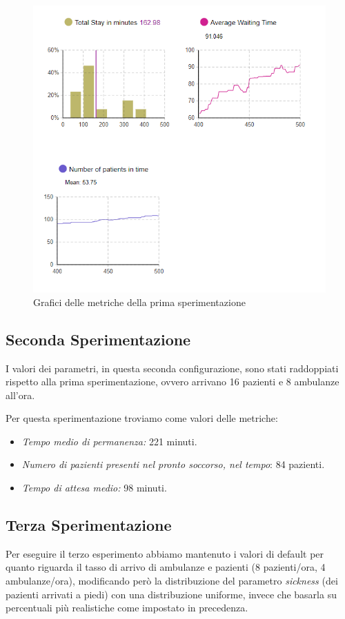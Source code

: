 \begin{figure}[!h]
    \centering
    \includegraphics[width=1\textwidth]{Immagini/sper1.png} 
    \caption{Grafici delle metriche della prima sperimentazione}
    \label{fig:graf1}
\end{figure}
\clearpage
\subsection{Seconda Sperimentazione} \label{cahp:seconda}
I valori dei parametri, in questa seconda configurazione, sono stati raddoppiati rispetto alla prima sperimentazione, ovvero arrivano 16 pazienti e 8 ambulanze all'ora. 


Per questa sperimentazione troviamo come valori delle metriche:
\begin{itemize}
    \item \textit{Tempo medio di permanenza:} 221 minuti.
    \item \textit{Numero di pazienti presenti nel pronto soccorso, nel tempo}: 84 pazienti.
    \item \textit{Tempo di attesa medio:} 98 minuti.
\end{itemize}

\subsection{Terza Sperimentazione}
Per eseguire il terzo esperimento abbiamo mantenuto i valori di default per quanto riguarda il tasso di arrivo di ambulanze e pazienti (8 pazienti/ora, 4 ambulanze/ora), modificando però la distribuzione del parametro \textit{sickness} (dei pazienti arrivati a piedi) con una distribuzione uniforme, invece che basarla su percentuali più realistiche come impostato in precedenza. 

